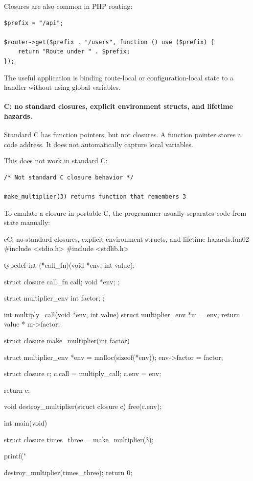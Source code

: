 \documentclass[a4paper,twoside]{report}
\begin{document}
Closures are also common in PHP routing:

\begin{verbatim}
$prefix = "/api";

$router->get($prefix . "/users", function () use ($prefix) {
    return "Route under " . $prefix;
});
\end{verbatim}

The useful application is binding route-local or configuration-local state to a handler without using global variables.

\paragraph{C: no standard closures, explicit environment structs, and lifetime hazards.}

Standard C has function pointers, but not closures. A function pointer stores a code address. It does not automatically capture local variables.

This does not work in standard C:

\begin{verbatim}
/* Not standard C closure behavior */

make_multiplier(3) returns function that remembers 3
\end{verbatim}

To emulate a closure in portable C, the programmer usually separates code from state manually:

\begin{codebox}[]{c}{C: no standard closures, explicit environment structs, and lifetime hazards.}{fun02}
#include <stdio.h>
#include <stdlib.h>

typedef int (*call_fn)(void *env, int value);

struct closure {
    call_fn call;
    void *env;
};

struct multiplier_env {
    int factor;
};

int multiply_call(void *env, int value) {
    struct multiplier_env *m = env;
    return value * m->factor;
}

struct closure make_multiplier(int factor) {
    struct multiplier_env *env = malloc(sizeof(*env));
    env->factor = factor;

    struct closure c;
    c.call = multiply_call;
    c.env = env;

    return c;
}

void destroy_multiplier(struct closure c) {
    free(c.env);
}

int main(void) {
    struct closure times_three = make_multiplier(3);

    printf("%

    destroy_multiplier(times_three);
    return 0;
}
\end{codebox}
\end{document}
